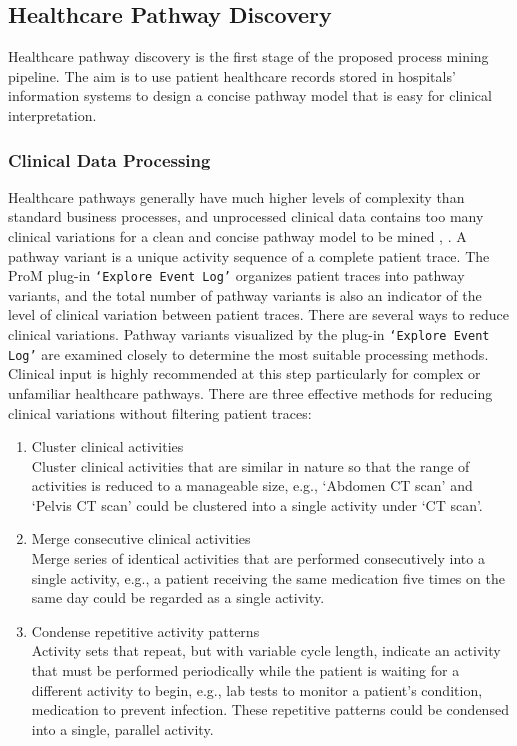 \documentclass{elsarticle}
\begin{document}
\subsection{Healthcare Pathway Discovery}
Healthcare pathway discovery is the first stage of the proposed process mining pipeline. The aim is to use patient healthcare records stored in hospitals’ information systems to design a concise pathway model that is easy for clinical interpretation.

\subsubsection{Clinical Data Processing}
Healthcare pathways generally have much higher levels of complexity than standard business processes, and unprocessed clinical data contains too many clinical variations for a clean and concise pathway model to be mined \cite{Huang2013}, \cite{Veiga2010}. A pathway variant is a unique activity sequence of a complete patient trace. The ProM plug-in \texttt{`Explore Event Log'} organizes patient traces into pathway variants, and the total number of pathway variants is also an indicator of the level of clinical variation between patient traces. 
There are several ways to reduce clinical variations. Pathway variants visualized by the plug-in \texttt{`Explore Event Log'} are examined closely to determine the most suitable processing methods. Clinical input is highly recommended at this step particularly for complex or unfamiliar healthcare pathways. There are three effective methods for reducing clinical variations without filtering patient traces:

\begin{enumerate}
    \item Cluster clinical activities\\
        Cluster clinical activities that are similar in nature so that the range of activities is reduced to a manageable size, e.g., `Abdomen CT scan' and `Pelvis CT scan' could be clustered into a single activity under `CT scan'.
    \item Merge consecutive clinical activities\\
        Merge series of identical activities that are performed consecutively into a single activity, e.g., a patient receiving the same medication five times on the same day could be regarded as a single activity.
    \item Condense repetitive activity patterns\\
        Activity sets that repeat, but with variable cycle length, indicate an activity that must be performed periodically while the patient is waiting for a different activity to begin, e.g., lab tests to monitor a patient’s condition, medication to prevent infection. These repetitive patterns could be condensed into a single, parallel activity.
\end{enumerate}
\end{document}

